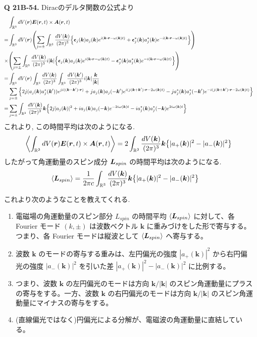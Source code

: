 \documentclass[uplatex,dvipdfmx,a4paper,11pt]{jlreq}
\newcommand{\RR}{\mathbb{R}}
\newcommand{\EE}{\bm{E}}
\renewcommand{\AA}{\bm{A}}
\newcommand{\rr}{\bm{r}}
\newcommand{\kk}{\bm{k}}
\theoremstyle{definition}
\begin{document}
\textbf{Q 21B-54.}
Diracのデルタ関数の公式より
\begin{align}
         & \int_{\RR^3}dV(\rr)\EE(\rr, t)\times\AA(\rr, t)                                                                                                                                                                \\
  =      & \int_{\RR^3}dV(\rr)\qty(\sum_{j=\pm}\int_{\RR^3}\frac{dV(\kk)}{(2\pi)^3}\qty{\ee_j(\kk)a_j(\kk)e^{i(\kk\vdot\rr - \omega(\kk)t)} + \ee_j^*(\kk)a_j^*(\kk)e^{-i(\kk\vdot\rr - \omega(\kk)t)}})                  \\
  \times & \qty(\sum_{j=\pm}\int_{\RR^3}\frac{dV(\kk)}{(2\pi)^3}i|\kk|\qty{\ee_j(\kk)a_j(\kk)e^{i(\kk\vdot\rr - \omega(\kk)t)} - \ee_j^*(\kk)a_j^*(\kk)e^{-i(\kk\vdot\rr - \omega(\kk)t)}})                               \\
  =      & \int_{\RR^3}dV(\rr)\int_{\RR^3}\frac{dV(\kk)}{(2\pi)^3}\int_{\RR^3}\frac{dV(\kk')}{(2\pi)^3}i|\kk|\frac{\kk}{|\kk|}                                                                                            \\
         & \sum_{j=\pm}\qty{2j(a_j(\kk)a_j^*(\kk'))e^{ji((\kk - \kk')\vdot\rr)} + ja_j(\kk)a_j(-\kk')e^{i(j(\kk + \kk')\vdot\rr - 2\omega(\kk)t)} - ja_j^*(\kk)a_j^*(-\kk')e^{-i(j(\kk + \kk')\vdot\rr - 2\omega(\kk)t)}} \\
  =      & \sum_{j=\pm}\int_{\RR^3}\frac{dV(\kk)}{(2\pi)^3}\kk\qty{2j|a_j(\kk)|^2 + i a_j(\kk)a_j(-\kk)e^{-2i\omega(\kk)t} - i a_j^*(\kk)a_j^*(-\kk)e^{2i\omega(\kk)t}}
\end{align}
これより, この時間平均は次のようになる.
\begin{align}
  \left\langle\int_{\RR^3}dV(\rr)\EE(\rr, t)\times\AA(\rr, t)\right\rangle = 2\int_{\RR^3}\frac{dV(\kk)}{(2\pi)^3}\kk\qty{|a_+(\kk)|^2 - |a_-(\kk)|^2}
\end{align}
したがって角運動量のスピン成分 $\bm{L}_{spin}$ の時間平均は次のようになる.
\begin{align}
  \langle\LL_{spin}\rangle & = \frac{1}{2\pi c}\int_{\RR^3}\frac{dV(\kk)}{(2\pi)^3}\kk\qty{|a_+(\kk)|^2 - |a_-(\kk)|^2}
\end{align}

これより次のようなことを教えてくれる.
\begin{enumerate}
  \item 電磁場の角運動量のスピン部分 $L_{spin}$ の時間平均 $\langle\bm{L}_{spin}\rangle$ に対して、各 Fourier モード $(k, \pm)$ は波数ベクトル $\kk$ に重みづけをした形で寄与する。つまり、各 Fourier モードは縦波として $\langle\bm{L}_{spin}\rangle$ へ寄与する。
  \item 波数 $\kk$ のモードの寄与する重みは、左円偏光の強度 $|a_+(\kk)|^2$ から右円偏光の強度 $|a_-(\kk)|^2$ を引いた差 $|a_+(\kk)|^2 - |a_-(\kk)|^2$ に比例する。
  \item つまり、波数 $\kk$ の左円偏光のモードは方向 $\kk/|\kk|$ のスピン角運動量にプラスの寄与をする。一方、波数 $\kk$ の右円偏光のモードは方向 $\kk/|\kk|$ のスピン角運動量にマイナスの寄与をする。
  \item (直線偏光ではなく)円偏光による分解が、電磁波の角運動量に直結している。
\end{enumerate}
\end{document}
